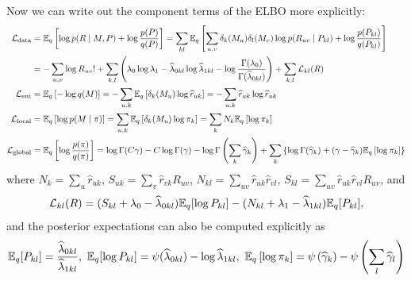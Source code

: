 \documentclass{article}
\begin{document}
 Now we can write out the component terms of the ELBO more explicitly:
\begin{equation}
\begin{split}
\mathcal{L}_{\text{data}}
&= \mathbb{E}_q\left[\log p(R\mid M,P)+ \log\frac{p(P)}{q(P)}\right]
= \sum_{kl}\mathbb{E}_q\left[\sum_{u,v}\delta_{k}(M_u)\delta_l(M_v)\log p(R_{uv}\mid P_{kl})+ \log\frac{p(P_{kl})}{q(P_{kl})}\right] \\
&= -\sum_{u,v}\log R_{uv}! + \sum_{k,l} \left(\lambda_{0}\log\lambda_1-\widehat\lambda_{0kl}\log\widehat\lambda_{1kl} - \log\frac{\Gamma(\lambda_0)}{\Gamma(\widehat\lambda_{0kl})}\right) + \sum_{k,l} \mathcal{L}_{kl}(R)
~\\
\mathcal{L}_{\text{ent}}
&= \mathbb{E}_q\left[-\log q(M)\right]
= -\sum_{u,k}\mathbb{E}_q\left[\delta_{k}(M_u)\log \widehat r_{uk}\right]
= -\sum_{u,k}\widehat r_{uk}\log \widehat r_{uk}
~\\
\mathcal{L}_{\text{local}}
&= \mathbb{E}_q\left[\log p(M\mid \pi)\right]
= \sum_{u,k}\mathbb{E}_q\left[\delta_{k}(M_u)\log \pi_k\right]
= \sum_{k}N_k\mathbb{E}_q\left[\log \pi_k\right]
~\\
\mathcal{L}_{\text{global}}
&= \mathbb{E}_q\left[\log\frac{p(\pi)}{q(\pi)}\right]
= \log \Gamma(C\gamma) - C\log\Gamma(\gamma) -\log \Gamma\left(\sum_k\widehat\gamma_k\right) + \sum_k\left\{\log\Gamma(\widehat\gamma_k)+ (\gamma-\widehat\gamma_k)\mathbb{E}_q\left[\log \pi_k\right]\right\}
\end{split}
\end{equation}
where $N_k = \sum_{u}\widehat r_{uk}$, $S_{uk} = \sum_{v}\widehat r_{vk}R_{uv}$, $N_{kl} = \sum_{uv}\widehat r_{uk}\widehat r_{vl}$, $S_{kl} = \sum_{uv}\widehat r_{uk}\widehat r_{vl} R_{uv}$, and 
$$
\mathcal{L}_{kl}(R) 
= (S_{kl} + \lambda_{0} - \widehat\lambda_{0kl}) \mathbb{E}_q[\log P_{kl}]
   -(N_{kl} + \lambda_{1} - \widehat\lambda_{1kl}) \mathbb{E}_q[P_{kl}], 
$$
and the posterior expectations can also be computed explicitly as 
$$
\mathbb{E}_q[P_{kl}] =  \frac{\widehat\lambda_{0kl}}{\widehat\lambda_{1kl}}, ~
\mathbb{E}_q[\log P_{kl}] = \psi(\widehat\lambda_{0kl}) - \log \widehat\lambda_{1kl}, ~
\mathbb{E}_q\left[\log \pi_k\right] = \psi\left(\widehat\gamma_k\right) - \psi\left(\sum_l\widehat\gamma_l\right)
$$
\end{document}
